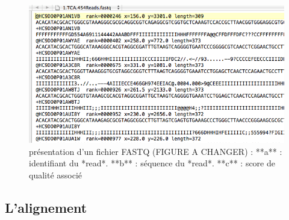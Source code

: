 \documentclass[12pt,twoside]{reedthesis}
\theoremstyle{definition}
\theoremstyle{definition}
\theoremstyle{remark}
\begin{document}
  \begin{figure}
  
  {\centering \includegraphics[scale=.55]{figure/fastq} 
  
  }
  
  \caption[présentation d'un fichier FASTQ (FIGURE A CHANGER)]{présentation d'un fichier FASTQ (FIGURE A CHANGER) : **a** : identifiant du *read*. **b** : séquence du *read*. **c** : score de qualité associé}\label{fig:fastqformat}
  \end{figure}
  
  \hypertarget{lalignement}{\subsection{L'alignement}\label{lalignement}}
  
\end{document}

